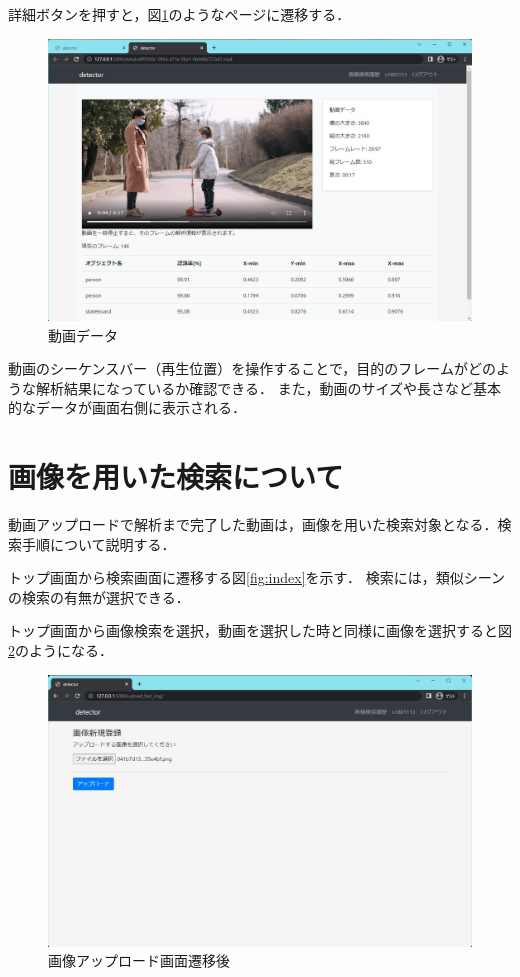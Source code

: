 \documentclass[a4j,12pt,dvipdfmx]{jreport}
\begin{document}
詳細ボタンを押すと，図\ref{fig:detail}のようなページに遷移する．
\begin{figure}[H]
  \centering
  \includegraphics[width=13cm]{image/detail.jpg}
  \caption{動画データ}
  \label{fig:detail}
\end{figure}

動画のシーケンスバー（再生位置）を操作することで，目的のフレームがどのような解析結果になっているか確認できる．
また，動画のサイズや長さなど基本的なデータが画面右側に表示される．

\section{画像を用いた検索について}
動画アップロードで解析まで完了した動画は，画像を用いた検索対象となる．検索手順について説明する．

トップ画面から検索画面に遷移する図\ref{fig:index}を示す．
検索には，類似シーンの検索の有無が選択できる．

トップ画面から画像検索を選択，動画を選択した時と同様に画像を選択すると図\ref{fig:image_upload}のようになる．

\begin{figure}[H]
  \centering
  \includegraphics[width=13cm]{image/image_upload.jpg}
  \caption{画像アップロード画面遷移後}
  \label{fig:image_upload}
\end{figure}
\end{document}
